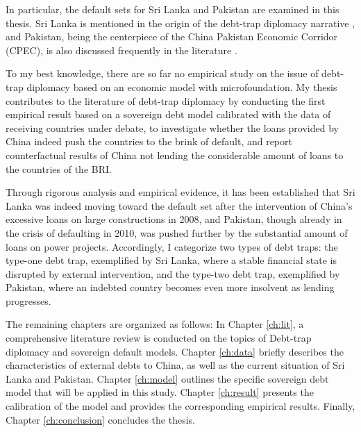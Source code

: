 In particular, the default sets for Sri Lanka and Pakistan are examined in this thesis. Sri Lanka is mentioned in the origin of the debt-trap diplomacy narrative \citep{Chellaney_2017}, and Pakistan, being the centerpiece of the China Pakistan Economic Corridor (CPEC), is also discussed frequently in the literature \citep{Hurley19-8-debt-trap}.

To my best knowledge, there are so far no empirical study on the issue of debt-trap diplomacy based on an economic model with microfoundation. My thesis contributes to the literature of debt-trap diplomacy by conducting the first empirical result based on a sovereign debt model calibrated with the data of receiving countries under debate, to investigate whether the loans provided by China indeed push the countries to the brink of default, and report counterfactual results of China not lending the considerable amount of loans to the countries of the BRI.

Through rigorous analysis and empirical evidence, it has been established that
Sri Lanka was indeed moving toward the default set after the intervention of China's excessive loans on large constructions in 2008, and Pakistan, though already in the crisis of defaulting in 2010, was pushed further by the substantial amount of loans on power projects.
Accordingly, I categorize two types of debt traps: the type-one debt trap, exemplified by Sri Lanka, where a stable financial state is disrupted by external intervention, and the type-two debt trap, exemplified by Pakistan, where an indebted country becomes even more insolvent as lending progresses.

The remaining chapters are organized as follows:
In Chapter \ref{ch:lit}, a comprehensive literature review is conducted on the topics of Debt-trap diplomacy and sovereign default models.
Chapter \ref{ch:data} briefly describes the characteristics of external debts to China, as well as the current situation of Sri Lanka and Pakistan.
Chapter \ref{ch:model} outlines the specific sovereign debt model that will be applied in this study.
Chapter \ref{ch:result} presents the calibration of the model and provides the corresponding empirical results.
Finally, Chapter \ref{ch:conclusion} concludes the thesis.


